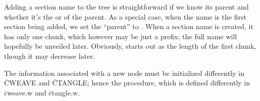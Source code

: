 Adding a section name to the tree is straightforward if we know its
parent and whether it's the  or  of the parent.  As
a
special case, when the name is the first section being added, we set the
``parent'' to \PB{$\NULL$}.  When a section name is created, it has only one
chunk, which however may be just a prefix; the full name will
hopefully be unveiled later.  Obviously,  starts
out as the length of the first chunk, though it may decrease later.

The information associated with a new node must be initialized
differently in \.{CWEAVE} and \.{CTANGLE}; hence the
 procedure, which is defined differently in \.{cweave.w}
and \.{ctangle.w}.

